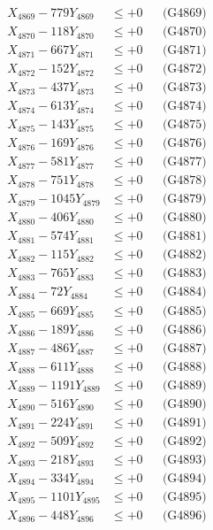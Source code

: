 \documentclass[a4paper,10pt]{article}
\begin{document}
{\begin{align}
X_{4869} - 779Y_{4869} &\leq +0 && \text{(G4869)} \\
X_{4870} - 118Y_{4870} &\leq +0 && \text{(G4870)} \\
\allowbreak
X_{4871} - 667Y_{4871} &\leq +0 && \text{(G4871)} \\
X_{4872} - 152Y_{4872} &\leq +0 && \text{(G4872)} \\
X_{4873} - 437Y_{4873} &\leq +0 && \text{(G4873)} \\
X_{4874} - 613Y_{4874} &\leq +0 && \text{(G4874)} \\
X_{4875} - 143Y_{4875} &\leq +0 && \text{(G4875)} \\
X_{4876} - 169Y_{4876} &\leq +0 && \text{(G4876)} \\
X_{4877} - 581Y_{4877} &\leq +0 && \text{(G4877)} \\
X_{4878} - 751Y_{4878} &\leq +0 && \text{(G4878)} \\
X_{4879} - 1045Y_{4879} &\leq +0 && \text{(G4879)} \\
X_{4880} - 406Y_{4880} &\leq +0 && \text{(G4880)} \\
\allowbreak
X_{4881} - 574Y_{4881} &\leq +0 && \text{(G4881)} \\
X_{4882} - 115Y_{4882} &\leq +0 && \text{(G4882)} \\
X_{4883} - 765Y_{4883} &\leq +0 && \text{(G4883)} \\
X_{4884} - 72Y_{4884} &\leq +0 && \text{(G4884)} \\
X_{4885} - 669Y_{4885} &\leq +0 && \text{(G4885)} \\
X_{4886} - 189Y_{4886} &\leq +0 && \text{(G4886)} \\
X_{4887} - 486Y_{4887} &\leq +0 && \text{(G4887)} \\
X_{4888} - 611Y_{4888} &\leq +0 && \text{(G4888)} \\
X_{4889} - 1191Y_{4889} &\leq +0 && \text{(G4889)} \\
X_{4890} - 516Y_{4890} &\leq +0 && \text{(G4890)} \\
\allowbreak
X_{4891} - 224Y_{4891} &\leq +0 && \text{(G4891)} \\
X_{4892} - 509Y_{4892} &\leq +0 && \text{(G4892)} \\
X_{4893} - 218Y_{4893} &\leq +0 && \text{(G4893)} \\
X_{4894} - 334Y_{4894} &\leq +0 && \text{(G4894)} \\
X_{4895} - 1101Y_{4895} &\leq +0 && \text{(G4895)} \\
X_{4896} - 448Y_{4896} &\leq +0 && \text{(G4896)} \\

\end{align}}
\end{document}
